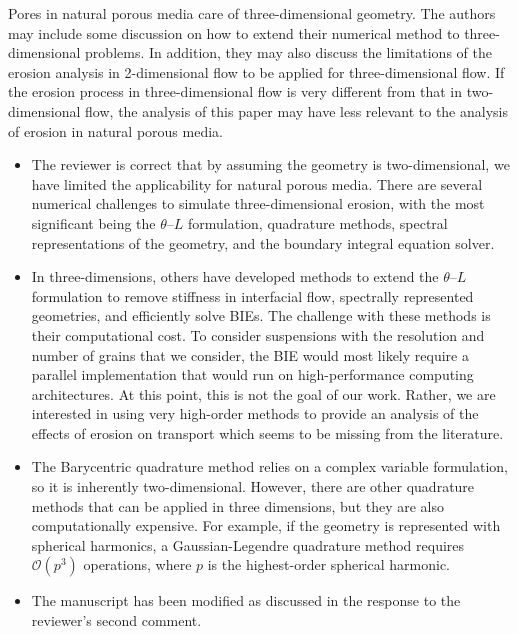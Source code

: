 \documentclass[11pt]{article}
\newcommand{\comment}[1]{{\color{blue} #1}}
\begin{document}
\noindent
\comment{Pores in natural porous media care of three-dimensional
geometry.  The authors may include some discussion on how to extend
their numerical method to three-dimensional problems.  In addition, they
may also discuss the limitations of the erosion analysis in
2-dimensional flow to be applied for three-dimensional flow. If the
erosion process in three-dimensional flow is very different from that in
two-dimensional flow, the analysis of this paper may have less relevant
to the analysis of erosion in natural porous media.}
\begin{itemize}
  \item The reviewer is correct that by assuming the geometry is
    two-dimensional, we have limited the applicability for natural
    porous media. There are several numerical challenges to simulate
    three-dimensional erosion, with the most significant being the
    $\theta$--$L$ formulation, quadrature methods, spectral
    representations of the geometry, and the boundary integral equation
    solver.

  \item In three-dimensions, others have developed methods to extend the
    $\theta$--$L$ formulation to remove stiffness in interfacial flow,
    spectrally represented geometries, and efficiently solve BIEs.  The
    challenge with these methods is their computational cost. To
    consider suspensions with the resolution and number of grains that
    we consider, the BIE would most likely require a parallel
    implementation that would run on high-performance computing
    architectures. At this point, this is not the goal of our work.
    Rather, we are interested in using very high-order methods to
    provide an analysis of the effects of erosion on transport which
    seems to be missing from the literature.

  \item The Barycentric quadrature method relies on a complex variable
    formulation, so it is inherently two-dimensional. However, there are
    other quadrature methods that can be applied in three dimensions,
    but they are also computationally expensive. For example, if the
    geometry is represented with spherical harmonics, a
    Gaussian-Legendre quadrature method requires $\mathcal{O}(p^3)$
    operations, where $p$ is the highest-order spherical harmonic.

  \item The manuscript has been modified as discussed in the response to
    the reviewer's second comment.
\end{itemize}
 
\end{document}

